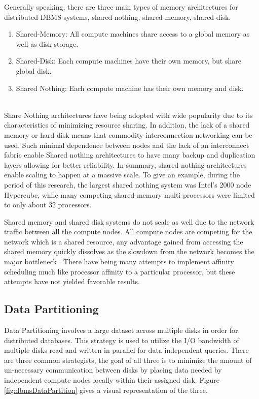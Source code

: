 \documentclass[10pt,twocolumn]{IEEEtran11}
\begin{document}
Generally speaking, there are three main types of memory 
architectures for distributed DBMS systems, shared-nothing, shared-memory, shared-disk.
\  \\
\begin{enumerate}
\setlength\itemsep{1em}
\item Shared-Memory: All compute machines share access to a global memory as well as disk storage.  
\item Shared-Disk: Each compute machines have their own memory, but share global disk.
\item Shared Nothing: Each compute machine has their own memory and disk. 
\end{enumerate}
\ \\
Share Nothing architectures have being adopted with wide popularity due to its characteristics of minimizing resource sharing.  In addition, the lack of a shared memory or hard disk means that commodity interconnection networking can be used.  Such minimal dependence between nodes and the lack of an interconnect fabric enable Shared nothing architectures to have many backup and duplication layers allowing for better reliability.  In summary, shared nothing architectures enable scaling to happen at a massive scale.  To give an example, during the period of this research, the largest shared nothing system was Intel's 2000 node Hypercube, while many competing shared-memory multi-processors were limited to only about 32 processors. 
\par
Shared memory and shared disk systems do not scale as well due to the network traffic between all the compute nodes.  All compute nodes are competing for the network which is a shared resource, any advantage gained from accessing the shared memory quickly dissolves as the slowdown from the network becomes the major bottleneck \cite{thakkar1990performance}.  There have being many attempts to implement affinity scheduling much like processor affinity to a particular processor, but these attempts have not yielded favorable results.  
\subsection{Data Partitioning}

Data Partitioning involves a large dataset across multiple disks in order for distributed databases.   This strategy is used to utilize the I/O bandwidth of multiple disks read and written in parallel for data independent queries.  There are three common strategists, the goal of all three is to minimize the amount of un-necessary communication between disks by placing data needed by independent compute nodes locally within their assigned disk. Figure \ref{fig:dbmsDataPartition} gives a visual representation of the three.
\end{document}
